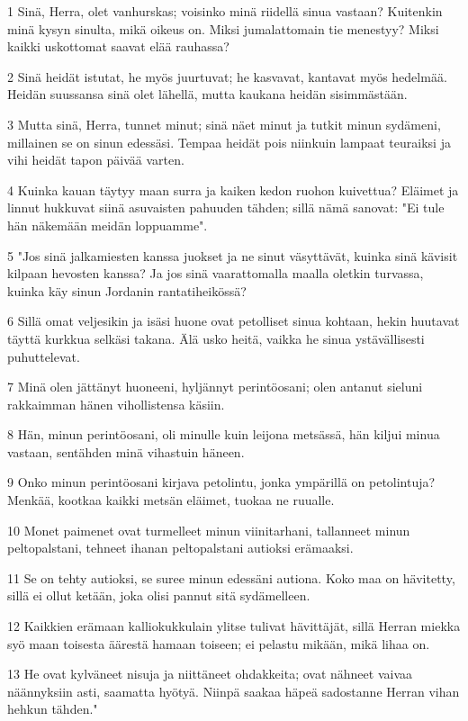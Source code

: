 \par 1 Sinä, Herra, olet vanhurskas; voisinko minä riidellä sinua vastaan? Kuitenkin minä kysyn sinulta, mikä oikeus on. Miksi jumalattomain tie menestyy? Miksi kaikki uskottomat saavat elää rauhassa?
\par 2 Sinä heidät istutat, he myös juurtuvat; he kasvavat, kantavat myös hedelmää. Heidän suussansa sinä olet lähellä, mutta kaukana heidän sisimmästään.
\par 3 Mutta sinä, Herra, tunnet minut; sinä näet minut ja tutkit minun sydämeni, millainen se on sinun edessäsi. Tempaa heidät pois niinkuin lampaat teuraiksi ja vihi heidät tapon päivää varten.
\par 4 Kuinka kauan täytyy maan surra ja kaiken kedon ruohon kuivettua? Eläimet ja linnut hukkuvat siinä asuvaisten pahuuden tähden; sillä nämä sanovat: "Ei tule hän näkemään meidän loppuamme".
\par 5 "Jos sinä jalkamiesten kanssa juokset ja ne sinut väsyttävät, kuinka sinä kävisit kilpaan hevosten kanssa? Ja jos sinä vaarattomalla maalla oletkin turvassa, kuinka käy sinun Jordanin rantatiheikössä?
\par 6 Sillä omat veljesikin ja isäsi huone ovat petolliset sinua kohtaan, hekin huutavat täyttä kurkkua selkäsi takana. Älä usko heitä, vaikka he sinua ystävällisesti puhuttelevat.
\par 7 Minä olen jättänyt huoneeni, hyljännyt perintöosani; olen antanut sieluni rakkaimman hänen vihollistensa käsiin.
\par 8 Hän, minun perintöosani, oli minulle kuin leijona metsässä, hän kiljui minua vastaan, sentähden minä vihastuin häneen.
\par 9 Onko minun perintöosani kirjava petolintu, jonka ympärillä on petolintuja? Menkää, kootkaa kaikki metsän eläimet, tuokaa ne ruualle.
\par 10 Monet paimenet ovat turmelleet minun viinitarhani, tallanneet minun peltopalstani, tehneet ihanan peltopalstani autioksi erämaaksi.
\par 11 Se on tehty autioksi, se suree minun edessäni autiona. Koko maa on hävitetty, sillä ei ollut ketään, joka olisi pannut sitä sydämelleen.
\par 12 Kaikkien erämaan kalliokukkulain ylitse tulivat hävittäjät, sillä Herran miekka syö maan toisesta äärestä hamaan toiseen; ei pelastu mikään, mikä lihaa on.
\par 13 He ovat kylväneet nisuja ja niittäneet ohdakkeita; ovat nähneet vaivaa näännyksiin asti, saamatta hyötyä. Niinpä saakaa häpeä sadostanne Herran vihan hehkun tähden."
